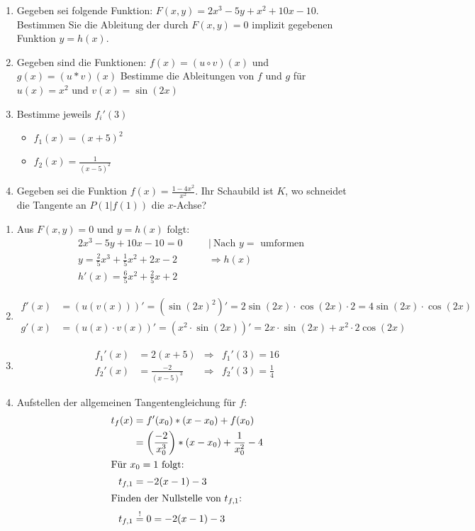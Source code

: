 \begin{enumerate}
	\item Gegeben sei folgende Funktion: $F(x,y)=2x^3-5y+x^2+10x-10$. Bestimmen Sie die Ableitung der durch $F(x,y)=0$ implizit gegebenen Funktion $y=h(x)$.
	\item Gegeben sind die Funktionen:
	$f(x) = (u \circ v)(x)$ und $g(x) = (u* v)(x)$
	Bestimme die Ableitungen von $f$ und $g$ für $u(x)=x^2$ und $v(x)=\sin(2x)$
	\item Bestimme jeweils $f_i'(3)$
	\begin{multicols}{2}
		\begin{itemize}
			\item $f_1(x) = (x+5)^2$
			\item $f_2(x) = \frac{1}{(x-5)^2}$
		\end{itemize}
	\end{multicols}
	\item Gegeben sei die Funktion $f(x) = \frac{1-4x^2}{x^2}$. Ihr Schaubild ist $K$, wo schneidet die Tangente an $P(1|f(1))$ die $x$-Achse?
\end{enumerate}
\begin{lsg}{}
	\begin{enumerate}
		\item Aus $F(x,y)=0$ und $y=h(x)$ folgt:\begin{alignat*}{2}
		&2x^3-5y+10x-10=0\quad&&|\ \text{Nach $y=$ umformen}\\
		&y=\frac{2}{5} x^3+\frac{1}{5} x^2+2x-2 &&\Rightarrow h(x)\\
		&h'(x)=\frac{6}{5} x^2+\frac{2}{5}x+2
		\end{alignat*}
		\item \begin{align*}
		f'(x)&=\left(u(v(x))\right)'=\left({\sin(2x)}^2\right)'=2\sin(2x)\cdot \cos(2x) \cdot 2=4\sin(2x)\cdot \cos(2x)\\
		g'(x)&=(u(x)\cdot v(x))'=\left(x^2\cdot \sin(2x)\right)'=2x\cdot \sin(2x)+x^2\cdot 2\cos(2x)
		\end{align*}
		\item \begin{align*}
		f_1'(x)&=2(x+5)&\Rightarrow  &f_1'(3)=16\\
		f_2'(x)&=\frac{-2}{(x-5)^3}&\Rightarrow &f_2'(3)=\frac{1}{4}
		\end{align*}
		\item Aufstellen der allgemeinen Tangentengleichung für $f$:
		\begin{align*}
			t_f(x)&=f'(x_0)*(x-x_0)+f(x_0)\\
						&=\left(\frac{-2}{x_0^3}\right)*(x-x_0)+\frac{1}{x_0^2}-4\\
			\intertext{Für $x_0=1$ folgt:}
			t_{f,1}&=-2(x-1)-3\\
			\intertext{Finden der Nullstelle von $t_{f,1}$:}
			t_{f,1}&\overset!=0=-2(x-1)-3\\
		\end{align*}
	\end{enumerate}
\end{lsg}

